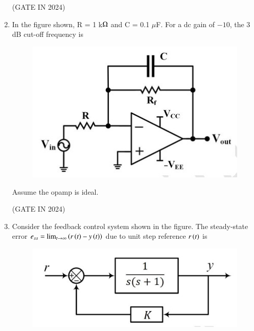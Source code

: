 \documentclass[journal,12pt,onecolumn]{IEEEtran}
\theoremstyle{remark}
\begin{document}
\begin{enumerate}
    \hfill{(GATE IN 2024)}
    \begin{enumerate}
    \end{enumerate}

    \item In the figure shown,  R = 1 k$\ohm$ and C = 0.1 $\mu$F. For a dc gain of $-10$, the 3 dB cut-off frequency  is
    \begin{figure}[H]
        \centering
        \includegraphics[width=0.6\columnwidth]{figs/p21.jpg}
        \caption*{}
        \label{fig:p21}
    \end{figure}
    Assume the opamp is ideal.

    \hfill{(GATE IN 2024)}
    \begin{enumerate}
    \end{enumerate}

    \item Consider the feedback control system shown in the figure.  The steady-state error $e_{ss} = \lim_{t \to \infty} \left(r\left(t\right) - y\left(t\right)\right)$ due to unit step reference $r\left(t\right)$ is
    \begin{figure}[H]
        \centering
        \includegraphics[width=0.6\columnwidth]{figs/p22.jpg}
        \caption*{}
        \label{fig:p22}
    \end{figure}
    

\end{enumerate}
\end{document}
